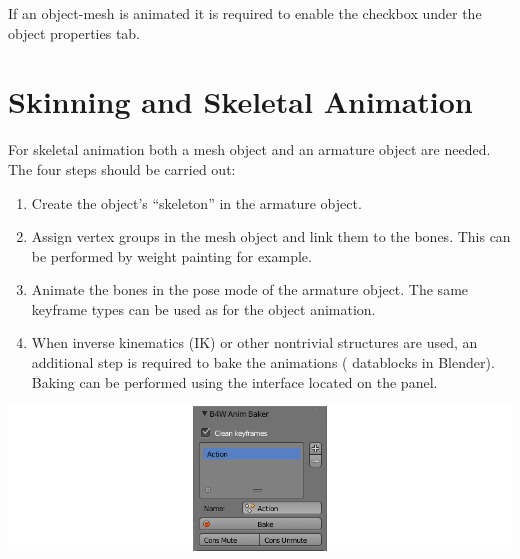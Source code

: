 \documentclass[a4paper,12pt,oneside]{sphinxmanual}
\begin{document}
If an object-mesh is animated it is required to enable the  checkbox under the object properties tab.


\section{Skinning and Skeletal Animation}
\label{animation:id4}
For skeletal animation both a mesh object and an armature object are needed. The four steps should be carried out:
\begin{enumerate}
\item {} 
Create the object's ``skeleton'' in the armature object.

\item {} 
Assign vertex groups in the mesh object and link them to the bones. This can be performed by weight painting for example.

\item {} 
Animate the bones in the pose mode of the armature object. The same keyframe types can be used as for the object animation.

\item {} 
When inverse kinematics (IK) or other nontrivial structures are used, an additional step is required to bake the animations ( datablocks in Blender). Baking can be performed using the  interface located on the  panel.

\end{enumerate}

{\hfill\includegraphics[width=1.000\linewidth]{baker.png}\hfill}

\begin{DUlineblock}{0em}
\item[] 
\end{DUlineblock}
\end{document}
